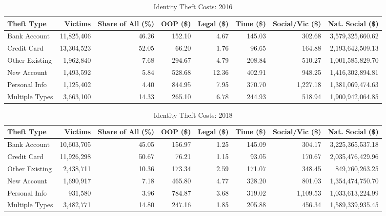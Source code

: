 \documentclass{article}
\begin{document}
\begin{table}[ht]
    \centering
    \caption{Identity Theft Costs: 2016}
    \scriptsize
    \begin{tabularx}{\textwidth}{X r r r r r r r}
        \toprule
        \textbf{Theft Type} & \textbf{Victims} & \textbf{Share of All (\%)} & \textbf{OOP (\$)} & \textbf{Legal (\$)} & \textbf{Time (\$)} & \textbf{Social/Vic (\$)} & \textbf{Nat. Social (\$)} \\ \midrule
        Bank Account & 11,825,406 & 46.26 & 152.10 & 4.67 & 145.03 & 302.68 & 3,579,325,660.62 \\
        Credit Card & 13,304,523 & 52.05 & 66.20 & 1.76 & 96.65 & 164.88 & 2,193,642,509.13 \\
        Other Existing & 1,962,840 & 7.68 & 294.67 & 4.79 & 208.84 & 510.27 & 1,001,585,829.70 \\
        New Account & 1,493,592 & 5.84 & 528.68 & 12.36 & 402.91 & 948.25 & 1,416,302,894.81 \\
        Personal Info & 1,125,402 & 4.40 & 844.95 & 7.95 & 370.70 & 1,227.18 & 1,381,069,474.63 \\
        Multiple Types & 3,663,100 & 14.33 & 265.10 & 6.78 & 244.93 & 518.94 & 1,900,942,064.85 \\
        \bottomrule
    \end{tabularx}
\end{table}

\begin{table}[ht]
    \centering
    \caption{Identity Theft Costs: 2018}
    \scriptsize
    \begin{tabularx}{\textwidth}{X r r r r r r r}
        \toprule
        \textbf{Theft Type} & \textbf{Victims} & \textbf{Share of All (\%)} & \textbf{OOP (\$)} & \textbf{Legal (\$)} & \textbf{Time (\$)} & \textbf{Social/Vic (\$)} & \textbf{Nat. Social (\$)} \\ \midrule
        Bank Account & 10,603,705 & 45.05 & 156.97 & 1.25 & 145.09 & 304.17 & 3,225,365,537.18 \\
        Credit Card & 11,926,298 & 50.67 & 76.21 & 1.15 & 93.05 & 170.67 & 2,035,476,429.96 \\
        Other Existing & 2,438,711 & 10.36 & 173.34 & 2.59 & 171.07 & 348.45 & 849,760,263.25 \\
        New Account & 1,690,917 & 7.18 & 465.80 & 4.77 & 328.20 & 801.03 & 1,354,474,750.70 \\
        Personal Info & 931,580 & 3.96 & 784.87 & 3.68 & 319.02 & 1,109.53 & 1,033,613,224.99 \\
        Multiple Types & 3,482,771 & 14.80 & 247.16 & 1.85 & 205.88 & 456.34 & 1,589,339,935.45 \\
        \bottomrule
    \end{tabularx}
\end{table}
\end{document}
